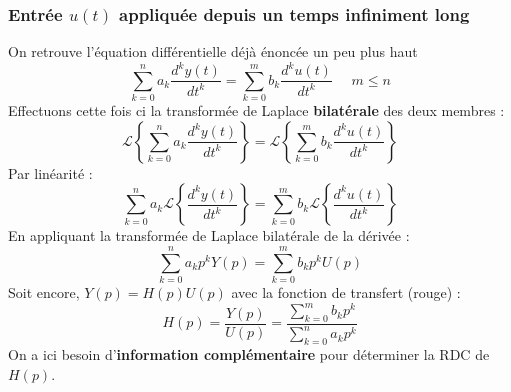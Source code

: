 \subsubsection{Entrée $u(t)$ appliquée depuis un temps infiniment long}
On retrouve l'équation différentielle déjà énoncée un peu plus haut
\begin{equation}
	\sum_{k=0}^n a_k\dfrac{d^ky(t)}{dt^k} = \sum_{k=0}^m b_k\dfrac{d^ku(t)}{dt^k}\ \ \ \ \ \
	m\leq n
\end{equation}
Effectuons cette fois ci la transformée de Laplace \textbf{bilatérale} des deux membres :
\begin{equation}
	\mathcal{L}\left\{\sum_{k=0}^n a_k\dfrac{d^ky(t)}{dt^k}\right\} =	\mathcal{L}\left\{
	\sum_{k=0}^m b_k\dfrac{d^ku(t)}{dt^k}\right\}
\end{equation}
Par linéarité :
\begin{equation}
	\sum_{k=0}^n a_k\mathcal{L}\left\{\dfrac{d^ky(t)}{dt^k}\right\} =	\sum_{k=0}^m b_k
	\mathcal{L}\left\{\dfrac{d^ku(t)}{dt^k}\right\}
\end{equation}
En appliquant la transformée de Laplace bilatérale de la dérivée :
\begin{equation}
	\sum_{k=0}^n a_kp^kY(p) = \sum_{k=0}^m b_kp^kU(p)
\end{equation}
Soit encore, $Y(p) = H(p)U(p)$ avec la fonction de transfert (rouge) :
\begin{equation}
	H(p) = \frac{Y(p)}{U(p)} = \frac{\sum_{k=0}^m b_kp^k}{\sum_{k=0}^n a_kp^k}
\end{equation}
On a ici besoin d'\textbf{information complémentaire} pour déterminer la RDC de $H(p)$.	
		
